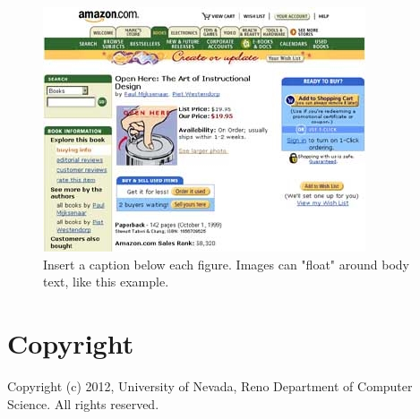 \documentclass{chi-ext}
\begin{document}
\begin{figure}
\parbox{1\columnwidth}{
  \centering
  \includegraphics[width=\columnwidth]{sample.jpg}
  \caption{Insert a caption below each figure. Images can "float" around body text, like this example.}
  \label{fig:sample}
}
\end{figure}%

\section{Copyright}
Copyright (c) 2012, University of Nevada, Reno Department of Computer Science.
All rights reserved.


\end{document}
